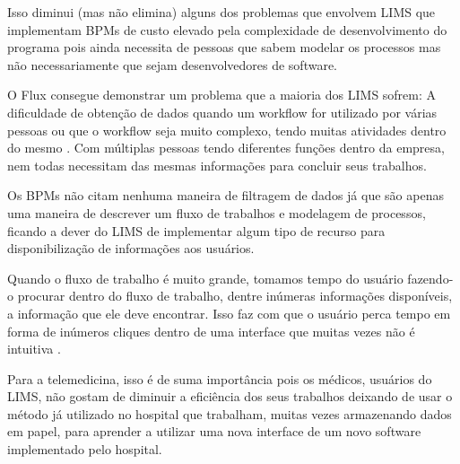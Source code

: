 Isso diminui (mas não elimina) alguns dos problemas que envolvem LIMS que implementam BPMs de custo elevado pela complexidade de desenvolvimento do programa pois ainda necessita de pessoas que sabem modelar os processos mas não necessariamente que sejam desenvolvedores de software.


O Flux consegue demonstrar um problema que a maioria dos LIMS sofrem: A dificuldade de obtenção de dados quando um workflow for utilizado por várias pessoas ou que o workflow seja muito complexo, tendo muitas atividades dentro do mesmo \R. Com múltiplas pessoas tendo diferentes funções dentro da empresa, nem todas necessitam das mesmas informações para concluir seus trabalhos.

Os BPMs não citam nenhuma maneira de filtragem de dados já que são apenas uma maneira de descrever um fluxo de trabalhos e modelagem de processos, ficando a dever do LIMS de implementar algum tipo de recurso para disponibilização de informações aos usuários.

Quando o fluxo de trabalho é muito grande, tomamos tempo do usuário fazendo-o procurar dentro do fluxo de trabalho, dentre inúmeras informações disponíveis, a informação que ele deve encontrar. Isso faz com que o usuário perca tempo em forma de inúmeros cliques dentro de uma interface que muitas vezes não é intuitiva \R.

Para a telemedicina, isso é de suma importância pois os médicos, usuários do LIMS, não gostam de diminuir a eficiência dos seus trabalhos deixando de usar o método já utilizado no hospital que trabalham, muitas vezes armazenando dados em papel, para aprender a utilizar uma nova interface de um novo software implementado pelo hospital.